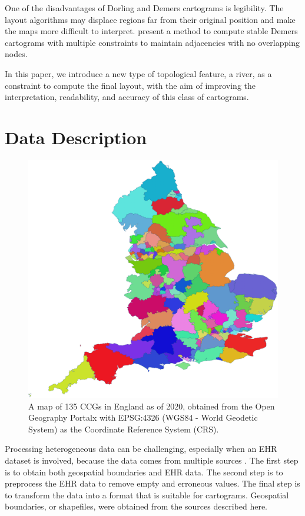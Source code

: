 \documentclass[Afour,sagev,times]{sagej}
\begin{document}
One of the disadvantages of Dorling and Demers cartograms is legibility.
The layout algorithms may displace regions far from their original position and make the maps more difficult to interpret.
\citet{nickel2022Multicriteria} present a method to compute stable Demers cartograms with multiple constraints to maintain adjacencies with no overlapping nodes.

In this paper, we introduce a new type of topological feature, a river, as a constraint to compute the final layout, with the aim of improving the interpretation, readability, and accuracy of this class of cartograms.

\section{Data Description}

 {
  \begin{figure}[b!]
      \centering
      \includegraphics[width=0.6\columnwidth]{ccg.png}
      \caption{A map of 135 CCGs in England as of 2020, obtained from the Open Geography Portalx \cite{opengeographyportalxOpen} with EPSG:4326 (WGS84 - World Geodetic System) as the Coordinate Reference System (CRS).}
      \label{fig:ccg}
  \end{figure}
 }

Processing heterogeneous data can be challenging, especially when an EHR dataset is involved, because the data comes from multiple sources \cite{wang2021EHR}.
The first step is to obtain both geospatial boundaries and EHR data.
The second step is to preprocess the EHR data to remove empty and erroneous values.
The final step is to transform the data into a format that is suitable for cartograms.
Geospatial boundaries, or shapefiles, were obtained from the sources described here.
\end{document}

